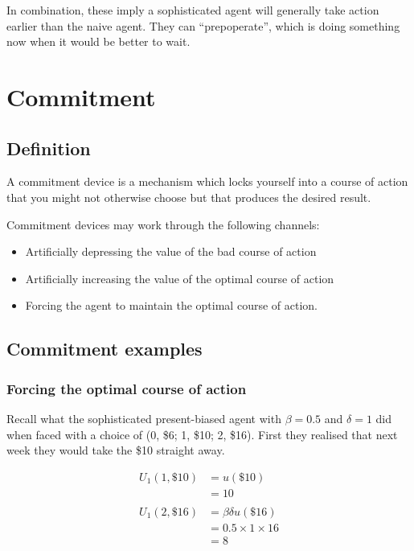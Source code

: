 \documentclass[
  letterpaper,
  DIV=11,
  numbers=noendperiod]{scrreprt}
\begin{document}
In combination, these imply a sophisticated agent will generally take
action earlier than the naive agent. They can ``prepoperate'', which is
doing something now when it would be better to wait.

\hypertarget{commitment}{%
\chapter{Commitment}\label{commitment}}

\hypertarget{definition}{%
\section{Definition}\label{definition}}

A commitment device is a mechanism which locks yourself into a course of
action that you might not otherwise choose but that produces the desired
result.

Commitment devices may work through the following channels:

\begin{itemize}
\item
  Artificially depressing the value of the bad course of action
\item
  Artificially increasing the value of the optimal course of action
\item
  Forcing the agent to maintain the optimal course of action.
\end{itemize}

\hypertarget{commitment-examples}{%
\section{Commitment examples}\label{commitment-examples}}

\hypertarget{forcing-the-optimal-course-of-action}{%
\subsection{Forcing the optimal course of
action}\label{forcing-the-optimal-course-of-action}}

Recall what the sophisticated present-biased agent with \(\beta=0.5\)
and \(\delta=1\) did when faced with a choice of (0, \$6; 1, \$10; 2,
\$16). First they realised that next week they would take the \$10
straight away.

\begin{align*}
U_1(1,\$10)&=u(\$10) \\
&=10 \\
\\
U_1(2,\$16)&=\beta\delta u(\$16) \\
&=0.5\times 1\times 16 \\
&=8
\end{align*}
\end{document}
